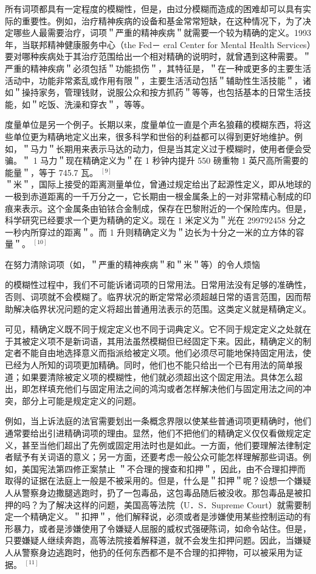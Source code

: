 所有词项都具有一定程度的模糊性，但是，由过分模糊而造成的困难却可以具有实际的重要性。例如，治疗精神疾病的设备和基金常常短缺，在这种情况下，为了决定哪些人最需要治疗，词项＂严重的精神疾病＂就需要一个较为精确的定义。1993年，当联邦精神健康服务中心（the Fed－ eral Center for Mental Health Services）要对哪种疾病处于其治疗范围给出一个相对精确的说明时，就曾遇到这种需要。＂严重的精神疾病＂必须包括＂功能损伤＂，其特征是，＂在一种或更多的主要生活活动中，功能非常紊乱或作用有限＂，主要生活活动包括＂辅助性生活技能＂，诸如＂操持家务，管理钱财，说服公众和按方抓药＂等等，也包括基本的日常生活技能，如＂吃饭、洗澡和穿衣＂，等等。

度量单位是另一个例子。长期以来，度量单位一直是个声名狼藉的模糊东西，将这些单位更为精确地定义出来，很多科学和世俗的利益都可以得到更好地维护。例如，＂马力＂长期用来表示马达的动力，但是当其定义过于模糊时，使用者便会受骗。＂ 1 马力＂现在精确定义为＂在 1 秒钟内提升 550 磅重物 1 英尺高所需要的能量＂，等于 745.7 瓦。 ${ }^{[9]}$\\
＂米＂，国际上接受的距离测量单位，曾通过规定给出了起源性定义，即从地球的一极到赤道距离的一千万分之一，它长期由一根金属条上的一对非常精心制成的印痕来表示。这个金属条由铂铱合金制成，保存在巴黎附近的一个保险库内。但是，科学研究已经要求一个更为精确的定义。现在 1 米定义为＂光在 299792458 分之一秒内所穿过的距离＂。而 1 升则精确定义为＂边长为十分之一米的立方体的容量＂。 ${ }^{[10]}$

在努力清除词项（如，＂严重的精神疾病＂和＂米＂等）的令人烦恼

的模糊性过程中，我们不可能诉诸词项的日常用法。日常用法没有足够的准确性，否则、词项就不会模糊了。临界状况的断定常常必须超越日常的语言范围，因而帮助解决临界状况问题的定义将超出普通用法表示的范围。这类定义就是精确定义。

可见，精确定义既不同于规定定义也不同于词典定义。它不同于规定定义之处就在于其被定义项不是新词语，其用法虽然模糊但已经固定下来。因此，精确定义的制定者不能自由地选择意义而指派给被定义项。他们必须尽可能地保持固定用法，使已经为人所知的词项更加精确。同时，他们也不能只给出一个已有用法的简单报道；如果要清除被定义项的模糊性，他们就必须超出这个固定用法。具体怎么超出，即怎样填充他们与固定用法之间的鸿沟或者怎样解决他们与固定用法之间的冲突，部分上可能是规定定义的问题。

例如，当上诉法庭的法官需要划出一条概念界限以使某些普通词项更精确时，他们通常要给出引进精确词项的理由。显然，他们不把他们的精确定义仅仅看做规定定义，甚至当他们超出了先例或固定用法时也是如此。一方面，他们要理解法律制定者赋予有关词语的意义；另一方面，还要考虑一般公众可能怎样理解那些词语。例如，美国宪法第四修正案禁止 ＂不合理的搜查和扣押＂，因此，由不合理扣押而取得的证据在法庭上一般是不被采用的。但是，什么是＂扣押＂呢？设想一个嫌疑人从警察身边撒腿逃跑时，扔了一包毒品，这包毒品随后被没收。那包毒品是被扣押的吗？为了解决这样的问题，美国高等法院（U．S．Supreme Court）就需要制定一个精确定义。＂扣押＂，他们解释说，必须或者是涉嫌使用某些控制运动的有形暴力，或者是涉嫌使用了令嫌疑人屈服的威权式强硬陈词，如命令站住。但是，只要嫌疑人继续奔跑，高等法院接着解释道，就不会发生扣押问题。因此，当嫌疑人从警察身边逃跑时，他扔的任何东西都不是不合理的扣押物，可以被采用为证据。 ${ }^{[11]}$

